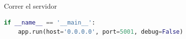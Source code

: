 \documentclass[
	12pt, %
]{fphw}
\begin{document}
\newpage

{\color{teal}
  \dotfill
  Correr el servidor
\dotfill}
\begin{lstlisting}[language=Python, caption=Ejecución Server]
if __name__ == '__main__':
    app.run(host='0.0.0.0', port=5001, debug=False)

\end{lstlisting}
\end{document}
